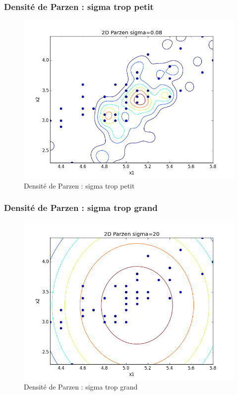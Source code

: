 \documentclass[a4paper,10pt]{article}
\begin{document}
\subsubsection{Densité de Parzen : sigma trop petit}
\begin{figure}[H]
	\includegraphics[width=12cm]{images/2D_Parzen_sigma_petit.png} 
	\centering
	\caption{Densité de Parzen : sigma trop petit}
	\label{fig:comp}
\end{figure}

\subsubsection{Densité de Parzen : sigma trop grand}
\begin{figure}[H]
	\includegraphics[width=12cm]{images/2D_Parzen_sigma_grand.png} 
	\centering
	\caption{Densité de Parzen : sigma trop grand}
	\label{fig:comp}
\end{figure}
\end{document}
